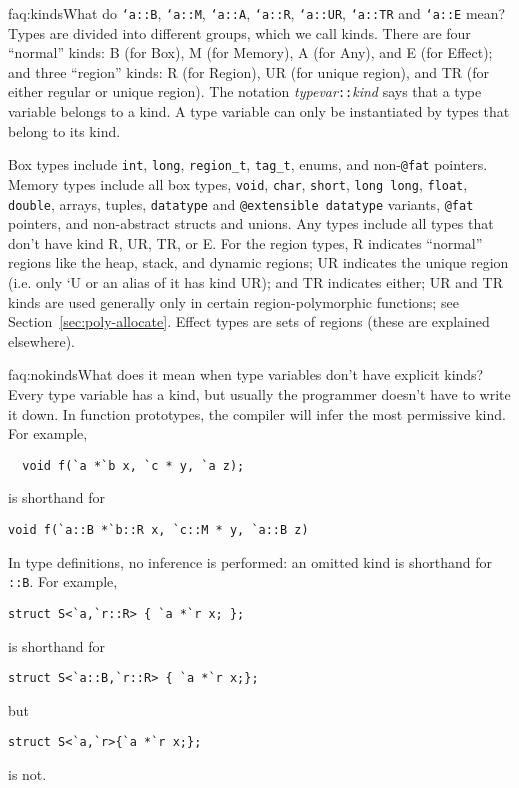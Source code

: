 \begin{faqa}{faq:kinds}{What do \texttt{`a::B}, \texttt{`a::M},
\texttt{`a::A}, \texttt{`a::R}, \texttt{`a::UR}, \texttt{`a::TR} and
\texttt{`a::E} mean?}  Types are divided into different groups, which we
call kinds.  There are four ``normal'' kinds: B (for Box), M (for Memory), A
(for Any), and E (for Effect); and three ``region'' kinds: R (for Region),
UR (for unique region), and TR (for either regular or unique region).  The
notation \textit{typevar}\texttt{::}\textit{kind} says that a type variable
belongs to a kind.  A type variable can only be instantiated by types that
belong to its kind.

Box types include \texttt{int}, \texttt{long}, \texttt{region_t},
\texttt{tag_t}, enums, and non-\texttt{@fat} pointers.  Memory types
include all box types, \texttt{void}, \texttt{char}, \texttt{short},
\texttt{long long}, \texttt{float}, \texttt{double}, arrays, tuples,
\texttt{datatype} and \texttt{@extensible datatype} variants,
\texttt{@fat} pointers, and non-abstract structs and unions.  Any
types include all types that don't have kind R, UR, TR, or E.  For the
region types, R indicates ``normal'' regions like the heap, stack, and
dynamic regions; UR indicates the unique region (i.e. only `U or an
alias of it has kind UR); and TR indicates either; UR and TR kinds are
used generally only in certain region-polymorphic functions; see
Section~\ref{sec:poly-allocate}.  Effect types are sets of regions
(these are explained elsewhere).
\end{faqa}

\begin{faqa}{faq:nokinds}{What does it mean when type variables don't have explicit kinds?}
Every type variable has a kind, but usually the programmer doesn't
have to write it down.  In function prototypes, the compiler will
infer the most permissive kind.  For example,
\begin{verbatim}
  void f(`a *`b x, `c * y, `a z);
\end{verbatim}
is shorthand for
\begin{verbatim}
void f(`a::B *`b::R x, `c::M * y, `a::B z)
\end{verbatim}
In type definitions, no inference is performed: an omitted kind is
shorthand for \texttt{::B}.  For example,
\begin{verbatim}
struct S<`a,`r::R> { `a *`r x; };
\end{verbatim}
is shorthand for
\begin{verbatim}
struct S<`a::B,`r::R> { `a *`r x;};
\end{verbatim}
but
\begin{verbatim}
struct S<`a,`r>{`a *`r x;};
\end{verbatim}
is not.
\end{faqa}

